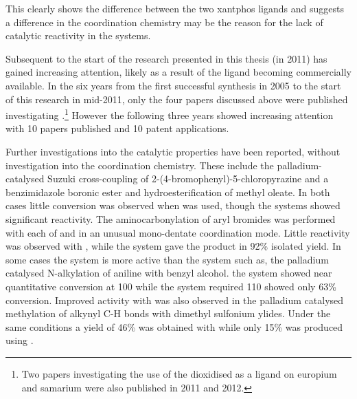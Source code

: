 This clearly shows the difference between the two xantphos ligands and suggests a difference in the coordination chemistry may be the reason for the lack of catalytic reactivity in the \tBuxantphos{} systems.  

Subsequent to the start of the research presented in this thesis (in 2011) \tBuxantphos{} has gained increasing attention, likely as a result of the ligand becoming commercially available.  In the six years 
from the first successful synthesis in 2005 to the start of this research in mid-2011, only the four papers discussed above were published investigating \tBuxantphos{}.\footnote{Two papers investigating the use of the dioxidised \tBuxantphos{} as a ligand on europium and samarium were also published in 2011 and 2012.\cite{Miyata2011, Miyata2012}}  However the following three years showed increasing attention with 10 papers published\cite{Friis2014, Raoufmoghaddam2014, Dang2013, Liu2013c, Raoufmoghaddam2013, Haibach2013, Behr2013, Ashcroft2013, Raoufmoghaddam2013b, Zhan2012} and 10 patent applications.\cite{Shang2010, Shang2011a, Shang2011b, Shang2011c, Shang2012a, Brandstadt2013a, Brandstadt2013b, Brandstadt2013c, Brandstadt2013d, Brandstadt2013e}

Further investigations into the catalytic properties have been reported, without investigation into the coordination chemistry.  These include the  palladium-catalysed Suzuki cross-coupling of 2-(4-bromophenyl)-5-chloropyrazine and a benzimidazole boronic ester and hydroesterification of methyl oleate.\cite{Ashcroft 2013, Behr2013} In both cases little conversion was observed when \tBuxantphos{} was used, though the \Phxantphos{} systems showed significant reactivity.  The aminocarbonylation of aryl bromides was performed with each of \Phxantphos{} and \tBuxantphos{} in an unusual mono-dentate coordination mode.\cite{Friis2014}  Little reactivity was observed with \tBuxantphos{}, while the \Phxantphos{} system gave the product in 92\% isolated yield.  In some cases the \tBuxantphos{} system is more active than the \Phxantphos{} system such as, the palladium catalysed N-alkylation of aniline with benzyl alcohol.\cite{Dang2013} the \tBuxantphos{} system showed near quantitative conversion at 100 \degC{} while the \Phxantphos{} system required 110 \degC{} showed only 63\% conversion.  Improved activity with \tBuxantphos{} was also observed in the palladium catalysed methylation of alkynyl C-H bonds with dimethyl sulfonium ylides.\cite{Liu2013c}  Under the same conditions a yield of 46\% was obtained with \tBuxantphos{} while only 15\% was produced using \Phxantphos{}.

